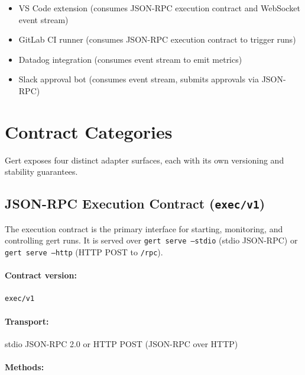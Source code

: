 \begin{itemize}
  \item VS Code extension (consumes JSON-RPC execution contract and WebSocket
        event stream)~\cite{vscode-extension-api}
  \item GitLab CI runner (consumes JSON-RPC execution contract to trigger runs)
  \item Datadog integration (consumes event stream to emit metrics)
  \item Slack approval bot (consumes event stream, submits approvals via
        JSON-RPC)
\end{itemize}

\section{Contract Categories}
\label{sec:contract-categories}

Gert exposes four distinct adapter surfaces, each with its own versioning
and stability guarantees.

\subsection{JSON-RPC Execution Contract (\texttt{exec/v1})}
\label{sec:jsonrpc-exec-contract}

The execution contract is the primary interface for starting, monitoring, and
controlling gert runs.  It is served over \texttt{gert serve --stdio} (stdio
JSON-RPC) or \texttt{gert serve --http} (HTTP POST to \texttt{/rpc}).

\paragraph{Contract version:} \texttt{exec/v1}

\paragraph{Transport:} stdio JSON-RPC 2.0 or HTTP POST (JSON-RPC over HTTP)

\paragraph{Methods:}

